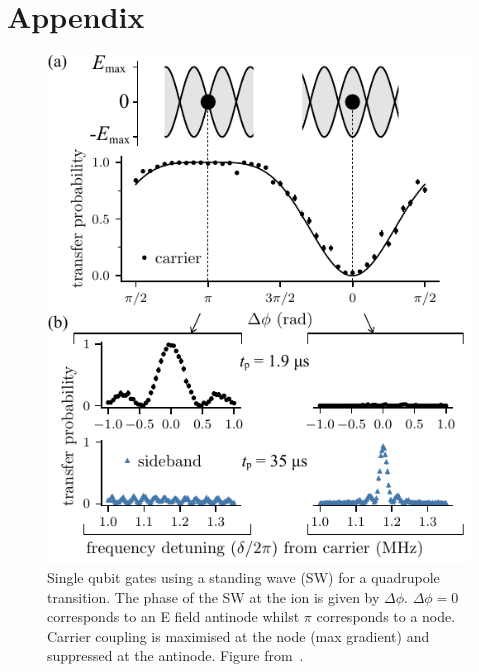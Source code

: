 \documentclass[12pt]{iopart}
\begin{document}
\section{Appendix}
\begin{figure}[!h]
  \begin{center}
   \noindent\includegraphics[width=0.6\linewidth]{figures/Figure_2_v3.pdf}
  \end{center}
  \caption{Single qubit gates using a standing wave (SW) for a
    quadrupole transition. The phase of the SW at the ion is given by
    $\Delta\phi$. $\Delta\phi = 0$ corresponds to an E field antinode
    whilst $\pi$ corresponds to a node. Carrier coupling is maximised
    at the node (max gradient) and suppressed at the antinode. Figure
    from~\cite{saner_breaking_2023}.}

  \label{fig:app1}
\end{figure}
\end{document}
